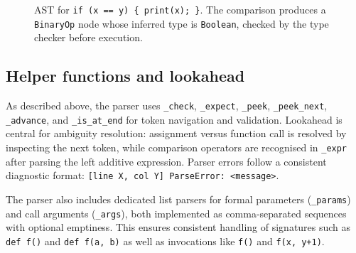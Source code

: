 \begin{figure}[H]
\centering
{}
\caption{AST for \texttt{if (x == y) \{ print(x); \}}. The comparison produces
a \texttt{BinaryOp} node whose inferred type is \texttt{Boolean}, checked by
the type checker before execution.}
\label{fig:ast-bool-example}
\end{figure}

\subsection{Helper functions and lookahead}
As described above, the parser uses \texttt{\_check}, \texttt{\_expect},
\texttt{\_peek}, \texttt{\_peek\_next}, \texttt{\_advance}, and
\texttt{\_is\_at\_end} for token navigation and validation. Lookahead is central
for ambiguity resolution: assignment versus function call is resolved by
inspecting the next token, while comparison operators are recognised in
\texttt{\_expr} after parsing the left additive expression. Parser errors
follow a consistent diagnostic format:
\texttt{[line X, col Y] ParseError: <message>}.

The parser also includes dedicated list parsers for formal parameters
(\texttt{\_params}) and call arguments (\texttt{\_args}), both implemented as
comma-separated sequences with optional emptiness. This ensures consistent
handling of signatures such as \texttt{def f()} and \texttt{def f(a, b)} as
well as invocations like \texttt{f()} and \texttt{f(x, y+1)}.

